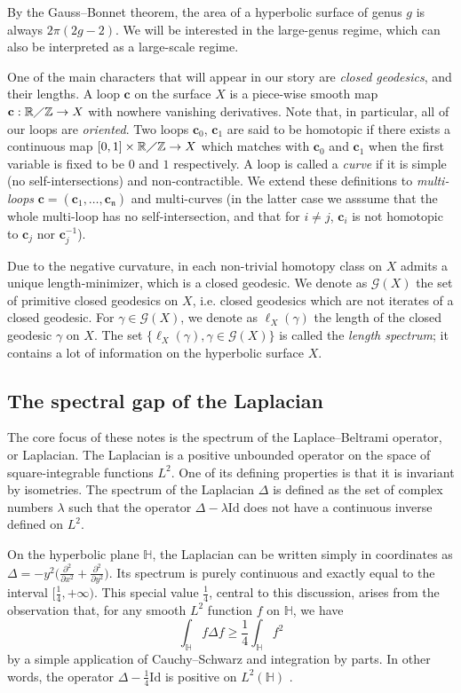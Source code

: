 \documentclass[12pt,twoside]{article}
\theoremstyle{theorem}
\theoremstyle{remark}
\theoremstyle{definition}
\theoremstyle{example}
\newcommand{\R}{\mathbb{R}}
\newcommand{\Z}{\mathbb{Z}}
\newcommand{\IH}{\mathbb{H}}
\newcommand{\1}[1]{\mathds{1}_{#1}}
\newcommand{\cG}{\mathcal{G}}
\newcommand{\cc}{\mathfrak{n}}
\newcommand{\curve}{\mathbf{c}}
\begin{document}
By the Gauss--Bonnet theorem, the area of a hyperbolic surface of genus $g$ is always
$2 \pi (2g-2)$. We will be interested in the large-genus regime, which can also be interpreted as a
large-scale regime.

One of the main characters that will appear in our story are \emph{closed geodesics}, and their
lengths.  A loop $\curve$ on the surface $X$ is a piece-wise smooth map
$\curve : \R \diagup \Z \rightarrow X$ with nowhere vanishing derivatives. Note that, in particular,
all of our loops are \emph{oriented}. Two loops $\curve_0$, $\curve_1$ are said to be homotopic if
there exists a continuous map $[0,1]\times \R \diagup \Z \rightarrow X$ which matches with
$\curve_0$ and $\curve_1$ when the first variable is fixed to be $0$ and $1$ respectively.  A loop
is called a \emph{curve} if it is simple (no self-intersections) and non-contractible. We extend
these definitions to \emph{multi-loops} $\curve = (\curve_1, \ldots, \curve_\cc)$ and multi-curves
(in the latter case we asssume that the whole multi-loop has no self-intersection, and that for
$i \neq j$, $\curve_i$ is not homotopic to $\curve_j$ nor $\curve_j^{-1}$).

Due to the negative curvature, in each non-trivial homotopy class on $X$ admits a unique
length-minimizer, which is a closed geodesic. We denote as $\cG(X)$ the set of primitive closed
geodesics on $X$, i.e. closed geodesics which are not iterates of a closed geodesic. For
$\gamma \in \cG(X)$, we denote as $\ell_X(\gamma)$ the length of the closed geodesic $\gamma$ on
$X$. The set $\{\ell_X(\gamma), \gamma \in \cG(X)\}$ is called the \emph{length spectrum}; it
contains a lot of information on the hyperbolic surface $X$.

\subsection{The spectral gap of the Laplacian}

The core focus of these notes is the spectrum of the Laplace--Beltrami operator, or Laplacian. The
Laplacian is a positive unbounded operator on the space of square-integrable functions $L^2$. One of
its defining properties is that it is invariant by isometries. The spectrum of the Laplacian
$\Delta$ is defined as the set of complex numbers $\lambda$ such that the operator
$\Delta - \lambda \mathrm{Id}$ does not have a continuous inverse defined on $L^2$.

On the hyperbolic plane $\IH$, the Laplacian can be written simply in coordinates as
$\Delta = -y^2 \big(\frac{\partial^2}{\partial x^2}+\frac{\partial^2}{\partial y^2}\big)$. Its
spectrum is purely continuous and exactly equal to the interval $[\frac 14, + \infty)$.  This
special value $\frac 14$, central to this discussion, arises from the observation that, for any
smooth $L^2$ function $f$ on $\IH$, we have
$$\int_\IH f \Delta f \geq \frac 14 \int_\IH f^2$$ by a simple application of Cauchy--Schwarz and
integration by parts. In other words, the operator $\Delta - \frac 14 \mathrm{Id}$ is positive on
$L^2(\IH)$ \cite{mckean1970}.
\end{document}

